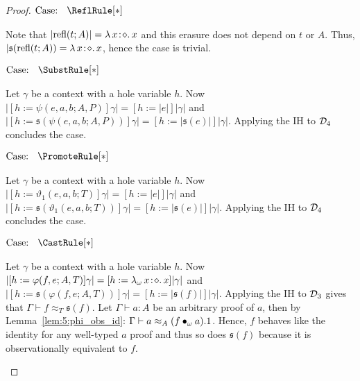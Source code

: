 \begin{proof}
    $\text{Case: }\begin{array}{c} \ReflRule[*] \end{array}$
    \begin{proofcase}
        Note that $|\textnormal{refl}(t; A)| = {\lambda}\, x\! : \! \diamond.\, x$ and this erasure does not depend on $t$ or $A$.
        Thus, $|\mathfrak{s}(\textnormal{refl}(t; A)) = {\lambda}\, x\! : \! \diamond.\, x$, hence the case is trivial.
    \end{proofcase}

    $\text{Case: }\begin{array}{c} \SubstRule[*] \end{array}$
    \begin{proofcase}
        Let $\gamma$ be a context with a hole variable $h$.
        Now $|[h := \psi(e, a, b; A, P)]\gamma| = [h := |e|]|\gamma|$ and $|[h := \mathfrak{s}(\psi(e, a, b; A, P))]\gamma| = [h := |\mathfrak{s}(e)|]|\gamma|$.
        Applying the IH to $\mathcal{D}_{4}$ concludes the case.
    \end{proofcase}

    $\text{Case: }\begin{array}{c} \PromoteRule[*] \end{array}$
    \begin{proofcase}
        Let $\gamma$ be a context with a hole variable $h$.
        Now $|[h := \vartheta_1(e, a, b; T)]\gamma| = [h := |e|]|\gamma|$ and $|[h := \mathfrak{s}(\vartheta_1(e, a, b; T))]\gamma| = [h := |\mathfrak{s}(e)|]|\gamma|$.
        Applying the IH to $\mathcal{D}_{4}$ concludes the case.
    \end{proofcase}

    $\text{Case: }\begin{array}{c} \CastRule[*] \end{array}$
    \begin{proofcase}
        Let $\gamma$ be a context with a hole variable $h$.
        Now $|[h := \varphi(f, e; A, T)]\gamma| = [h := {\lambda_\omega}\, x\! : \! \diamond.\, x]|\gamma|$ and $|[h := \mathfrak{s}(\varphi(f, e; A,T))]\gamma| = [h := |\mathfrak{s}(f)|]|\gamma|$.
        Applying the IH to $\mathcal{D}_{3}$ gives that $\Gamma \vdash f \approx_T \mathfrak{s}(f)$.
        Let $\Gamma \vdash a : A$ be an arbitrary proof of $a$, then by Lemma~\ref{lem:5:phi_obs_id}: $\Gamma \vdash a \approx_A (f \bullet_{\omega} a).1$.
        Hence, $f$ behaves like the identity for any well-typed $a$ proof and thus so does $\mathfrak{s}(f)$ because it is observationally equivalent to $f$.
    \end{proofcase}


\end{proof}
